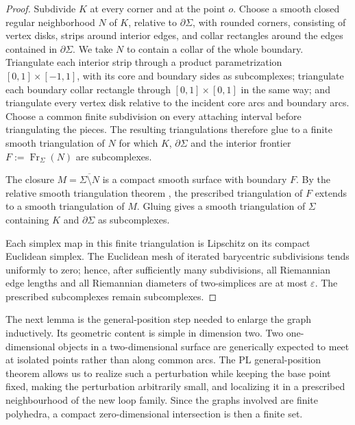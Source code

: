 \documentclass[11pt,a4paper,reqno]{article}
\theoremstyle{definition}
\theoremstyle{remark}
\begin{document}
\begin{proof}
Subdivide $K$ at every corner and at the point $o$. Choose a smooth closed regular neighborhood $N$ of $K$, relative to $\partial\Sigma$, with rounded corners, consisting of vertex disks, strips around interior edges, and collar rectangles around the edges contained in $\partial\Sigma$. We take $N$ to contain a collar of the whole boundary. Triangulate each interior strip through a product parametrization $[0,1]\times[-1,1]$, with its core and boundary sides as subcomplexes; triangulate each boundary collar rectangle through $[0,1]\times[0,1]$ in the same way; and triangulate every vertex disk relative to the incident core arcs and boundary arcs. Choose a common finite subdivision on every attaching interval before triangulating the pieces. The resulting triangulations therefore glue to a finite smooth triangulation of $N$ for which $K$, $\partial\Sigma$ and the interior frontier $F:=\operatorname{Fr}_\Sigma(N)$ are subcomplexes.

The closure $M=\overline{\Sigma\setminus N}$ is a compact smooth surface with boundary $F$. By the relative smooth triangulation theorem \cite[Theorem~10.6]{Mun66}, the prescribed triangulation of $F$ extends to a smooth triangulation of $M$. Gluing gives a smooth triangulation of $\Sigma$ containing $K$ and $\partial\Sigma$ as subcomplexes.

Each simplex map in this finite triangulation is Lipschitz on its compact Euclidean simplex. The Euclidean mesh of iterated barycentric subdivisions tends uniformly to zero; hence, after sufficiently many subdivisions, all Riemannian edge lengths and all Riemannian diameters of two-simplices are at most $\varepsilon$. The prescribed subcomplexes remain subcomplexes.
\end{proof}

The next lemma is the general-position step needed to enlarge the graph inductively. Its geometric content is simple in dimension two. Two one-dimensional objects in a two-dimensional surface are generically expected to meet at isolated points rather than along common arcs. The PL general-position theorem allows us to realize such a perturbation while keeping the base point fixed, making the perturbation arbitrarily small, and localizing it in a prescribed neighbourhood of the new loop family. Since the graphs involved are finite polyhedra, a compact zero-dimensional intersection is then a finite set.
\end{document}

